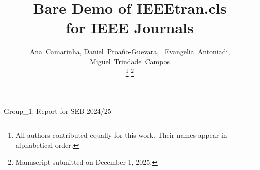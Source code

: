 \documentclass[journal]{IEEEtran}
\begin{document}
%
\title{Bare Demo of IEEEtran.cls\\ for IEEE Journals}
%
%
%

\author{Ana~Camarinha,
        Daniel~Proaño-Guevara,~
        Evangelia~Antoniadi,
        Miguel~Trindade~Campos%

\thanks{All authors contributed equally for this work. Their names appear in alphabetical order.}%
\thanks{Manuscript submitted on December 1, 2025.}}

% 
%



%
{Group_1: Report for SEB 2024/25}
% 
\end{document}
